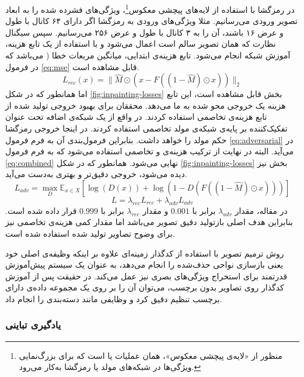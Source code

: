 در رمزگشا با استفاده از لایه‌های
پیچشی معکوس\footnote{منظور از «لایه‌ی پیچشی معکوس»، همان عملیات
 یا 
است که برای بزرگ‌نمایی ویژگی‌ها در شبکه‌های مولد یا رمزگشا به‌کار می‌رود.}،
ویژگی‌های فشرده شده را به ابعاد تصویر ورودی می‌رسانیم. مثلا ویژگی‌های ورودی به رمزگشا اگر دارای ۶۴ کانال با طول و عرض ۱۶ باشند، آن را به ۳ کانال با طول و عرض ۲۵۶ می‌رسانیم. سپس سیگنال نظارت که همان تصویر سالم است اعمال می‌شود و با استفاده از یک تابع هزینه، آموزش شبکه انجام می‌شود. تابع هزینه‌ی ابتدایی،
میانگین مربعات خطا (
می‌باشد
که در فرمول \ref{eq:mse} قابل مشاهده است.
\begin{equation}
    \label{eq:mse}
    L_{rec}(x) = \| \hat{M} \odot (x - F((1 -   \hat{M}) \odot x)) \|_2
\end{equation}
اما همانطور که در شکل \ref{fig:inpainting-losses} بخش 
قابل مشاهده است، این تابع هزینه یک خروجی محو شده به ما می‌دهد. محققان برای بهبود خروجی تولید شده از تابع هزینه‌ی تخاصمی استفاده کردند. در واقع از یک شبکه‌ی اضافه تحت عنوان
تفکیک‌کننده
بر پایه‌ی شبکه‌ی مولد تخاصمی استفاده کردند. در اینجا خروجی رمزگشا حکم مولد را خواهد داشت. بنابراین فرمول‌بندی آن به فرم فرمول \ref{eq:adversarial} در می‌آید.
البته در نهایت از ترکیب هزینه‌ی 
و تخاصمی استفاده می‌شود که به فرم فرمول
\ref{eq:combined}
نهایی می‌شود. همانطور که در شکل
\ref{fig:inpainting-losses}
بخش 
نیز دیده می‌شود، خروجی دقیق‌تر و بهتری به‌دست می‌آید.
\begin{equation}
    \label{eq:adversarial}
    L_{adv} = \max_{D} \mathbb{E}_{x \in X} [\log(D(x)) + \log(1 - D(F((1 - \hat{M}) \odot x)))]
\end{equation}
\begin{equation}
    \label{eq:combined}
    L = \lambda_{rec} L_{rec} + \lambda_{adv} L_{adv}
\end{equation}
در مقاله، مقدار
$\lambda_{adv}$ برابر با
$0.001$ و مقدار $\lambda_{rec}$ برابر با
$0.999$ قرار داده شده است.
بنابراین هدف اصلی بازتولید دقیق تصویر می‌باشد اما مقدار کمی هزینه‌ی تخاصمی نیز برای وضوح تصاویر تولید شده استفاده شده است.

روش ترمیم تصویر با استفاده از کدگذار زمینه‌ای علاوه بر اینکه وظیفه‌ی اصلی خود یعنی بازسازی نواحی حذف‌شده را انجام می‌دهد، به عنوان یک سیستم پیش‌آموزش قدرتمند برای استخراج ویژگی‌های بصری نیز عمل می‌کند. در حقیقت پس از آموزش کدگذار روی تصاویر بدون برچسب، می‌توان آن را بر روی یک مجموعه داده‌ی دارای برچسب تنظیم دقیق کرد و وظایفی مانند دسته‌بندی را انجام داد.

\subsubsection{یادگیری تباینی}

